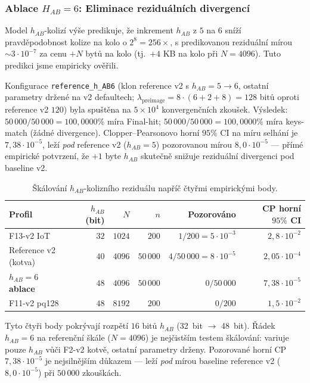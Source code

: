 \documentclass[11pt,a4paper]{article}
\begin{document}
\subsubsection{Ablace $H_{AB} = 6$: Eliminace reziduálních divergencí}\label{sec:empirical-habresidual}

Model $h_{AB}$-kolizí výše predikuje, že inkrement $h_{AB}$ z $5$ na $6$ sníží pravděpodobnost kolize na kolo o $2^8 = 256\times$, s predikovanou reziduální mírou $\sim 3 \cdot 10^{-7}$ za cenu $+N$ bytů na kolo (tj.\ $+4$ KB na kolo při $N = 4096$). Tuto predikci jsme empiricky ověřili.

Konfigurace \texttt{reference\_h\_AB6} (klon reference v2 s $h_{AB} = 5 \to 6$, ostatní parametry držené na v2 defaultech; $\lambda_\text{preimage} = 8 \cdot (6+2+8) = 128$ bitů oproti reference v2 $120$) byla spuštěna na $5 \times 10^4$ konvergenčních zkoušek. Výsledek: $50\,000 / 50\,000 = 100{,}0000\%$ míra Final-hit; $50\,000 / 50\,000 = 100{,}0000\%$ míra keys-match (žádné divergence). Clopper--Pearsonovo horní $95\%$ CI na míru selhání je $7{,}38 \cdot 10^{-5}$, leží \emph{pod} reference v2 ($h_{AB}=5$) pozorovanou mírou $8{,}0 \cdot 10^{-5}$ — přímé empirické potvrzení, že $+1$ byte $h_{AB}$ skutečně snižuje reziduální divergenci pod baseline v2.

\begin{table}[ht]
\centering
\small
\caption{Škálování $h_{AB}$-kolizního reziduálu napříč čtyřmi empirickými body.}
\label{tab:hab-scaling}
\begin{tabular}{lrrrrr}
\toprule
\textbf{Profil} & \textbf{$h_{AB}$ (bit)} & \textbf{$N$} & \textbf{$n$} & \textbf{Pozorováno} & \textbf{CP horní $95\%$ CI} \\
\midrule
F13-v2 IoT             & $32$ & $1024$ & $200$    & $1/200 = 5 \cdot 10^{-3}$ & $2{,}8 \cdot 10^{-2}$ \\
Reference v2 (kotva)   & $40$ & $4096$ & $50\,000$ & $4/50\,000 = 8 \cdot 10^{-5}$ & $2{,}05 \cdot 10^{-4}$ \\
\textbf{$h_{AB} = 6$ ablace} & \textbf{$48$} & \textbf{$4096$} & \textbf{$50\,000$} & \textbf{$0/50\,000$}  & \textbf{$7{,}38 \cdot 10^{-5}$} \\
F11-v2 pq128           & $48$ & $8192$ & $200$    & $0/200$                  & $1{,}5 \cdot 10^{-2}$ \\
\bottomrule
\end{tabular}
\end{table}

Tyto čtyři body pokrývají rozpětí $16$ bitů $h_{AB}$ (32~bit $\to$ 48~bit). Řádek $h_{AB} = 6$ na referenční škále ($N = 4096$) je nejčistším testem škálování: variuje pouze $h_{AB}$ vůči F2-v2 kotvě, ostatní parametry drženy. Pozorované horní CP $7{,}38 \cdot 10^{-5}$ je nejsilnějším důkazem — leží \emph{pod} mírou baseline reference v2 ($8{,}0 \cdot 10^{-5}$) při $50\,000$ zkouškách.
\end{document}
